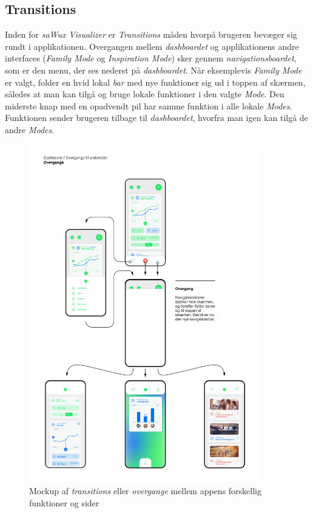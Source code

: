 \subsection{Transitions}
Inden for \emph{saWux Visualizer} er \emph{Transitions} måden hvorpå brugeren bevæger sig rundt i applikationen. Overgangen mellem \emph{dashboardet} og applikationens andre interfaces (\emph{Family Mode} og \emph{Inspiration Mode}) sker gennem \emph {navigationsboardet}, som er den menu, der ses nederst på \emph{dashboardet}. Når eksemplevis \emph {Family Mode} er valgt, folder en hvid lokal \emph{bar} med nye funktioner sig ud i toppen af skærmen, således at man kan tilgå og bruge lokale funktioner i den valgte \emph{Mode}. Den miderste knap med en opadvendt pil har samme funktion i alle lokale \emph{Modes}. Funktionen sender brugeren tilbage til \emph {dashboardet}, hvorfra man igen kan tilgå de andre \emph {Modes}.
\begin{figure}[H]
    \centering
    \includegraphics[width=0.9\textwidth]{Images/Transitions.png}
    \caption[\emph{Transitions} mockup]{Mockup af \emph{transitions} eller \emph{overgange} mellem appens forskellig funktioner og sider}
    \label{mockupg:teknisk:transitions}
\end{figure}

